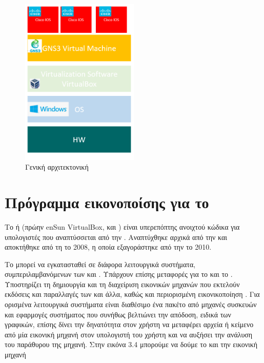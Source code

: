 \begin{figure}[htb]
	\centering
	\includegraphics[width=0.5\textwidth]{graphics/virtualization_architecture.PNG}
	\caption{ Γενική αρχιτεκτονική}
\end{figure}

\section{Πρόγραμμα εικονοποίσης για το }

Το  ή  (πρώην en{Sun VirtualBox},  και ) είναι υπερεπόπτης
ανοιχτού κώδικα για υπολογιστές  που αναπτύσσεται από την .
Αναπτύχθηκε αρχικά από την 
και αποκτήθηκε από τη  το 2008, η οποία εξαγοράστηκε από την  το 2010.

Το  μπορεί να εγκατασταθεί σε διάφορα λειτουργικά συστήματα, συμπεριλαμβανόμενων των  και .
Υπάρχουν επίσης μεταφορές για το  και το .
Υποστηρίζει τη δημιουργία και τη διαχείριση εικονικών μηχανών που εκτελούν εκδόσεις και παραλλαγές των 
και άλλα, καθώς και περιορισμένη εικονικοποίηση .
Για ορισμένα λειτουργικά συστήματα είναι διαθέσιμο ένα πακέτο  από μηχανές συσκευών και εφαρμογές συστήματος
που συνήθως βελτιώνει την απόδοση, ειδικά των γραφικών, επίσης δίνει την δηνατότητα στον χρήστη να μεταφέρει αρχεία ή κείμενο από μία εικονική μηχανή στον υπολογιστή του χρήστη και να αυξήσει την ανάλυση του παράθυρου της μηχανή. 
Στην εικόνα 3.4 μπορούμε να δούμε το  και την εικονική μηχανή 

